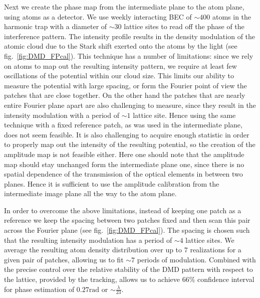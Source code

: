 Next we create the phase map from the intermediate plane to the atom plane, using atoms as a detector. We use weekly interacting BEC of $\sim 400$ atoms in the harmonic trap with a diameter of $\sim 30$ lattice sites to read off the phase of the interference pattern. The intensity profile results in the density modulation of the atomic cloud due to the Stark shift exerted onto the atoms by the light (see fig.~\ref{fig:DMD_FPcal}). This technique has a number of limitations: since we rely on atoms to map out the resulting intensity pattern, we require at least few oscillations of the potential within our cloud size. This limits our ability to measure the potential with large spacing, or form the Fourier point of view the patches that are close together. On the other hand the patches that are nearly entire Fourier plane apart are also challenging to measure, since they result in the intensity modulation with a period of $\sim 1$ lattice site. Hence using the same technique with a fixed reference patch, as was used in the intermediate plane, does not seem feasible. It is also challenging to acquire enough statistic in order to properly map out the intensity of the resulting potential, so the creation of the amplitude map is not feasible either. Here one should note that the amplitude map should stay unchanged form the intermediate plane one, since there is no spatial dependence of the transmission of the optical elements in between two planes. Hence it is sufficient to use the amplitude calibration from the intermediate image plane all the way to the atom plane.

In order to overcome the above limitations, instead of keeping one patch as a reference we keep the spacing between two patches fixed and then scan  this pair across the Fourier plane (see fig.~\ref{fig:DMD_FPcal}). The spacing  is chosen such that the resulting intensity modulation has a period of $\sim 4$ lattice sites. We average the resulting atom density distribution over up to $7$ realizations for a given pair of patches, allowing us to fit $\sim 7$ periods of modulation. Combined with the precise control over the relative stability of the DMD pattern with respect to the lattice, provided by the tracking, allows us to achieve $66\%$ confidence interval for phase estimation of $0.27 \mathrm{rad}$ or $\sim \frac{\lambda}{23}$. 

